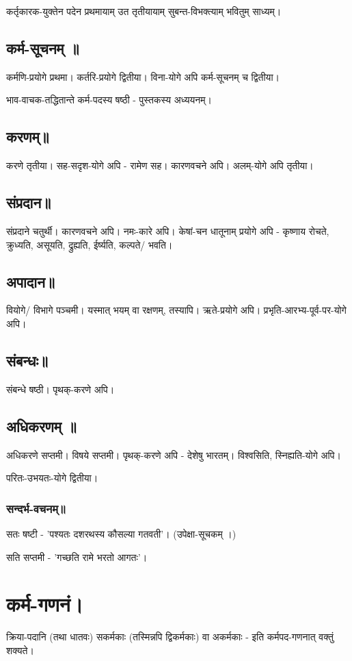 \documentclass[oneside, article]{memoir}
\begin{document}
कर्तृकारक-युक्तेन पदेन प्रथमायाम् उत तृतीयायाम् सुबन्त-विभक्त्याम् भवितुम् साध्यम्।

\subsection{कर्म-सूचनम् ॥}
कर्मणि-प्रयोगे प्रथमा। कर्तरि-प्रयोगे द्वितीया। विना-योगे अपि कर्म-सूचनम् च द्वितीया।

भाव-वाचक-तद्धितान्ते कर्म-पदस्य षष्ठी - पुस्तकस्य अध्ययनम्।

\subsection{करणम्॥}
करणे तृतीया। सह-सदृश-योगे अपि - रामेण सह। कारणवचने अपि। अलम्-योगे अपि तृतीया।

\subsection{संप्रदान॥}
संप्रदाने चतुर्थी। कारणवचने अपि। नमः-कारे अपि। केषां-चन धातूनाम् प्रयोगे अपि - कृष्णाय रोचते, क्रुध्यति, असूयति, द्रुह्यति, ईर्ष्यति, कल्पते/ भवति।

\subsection{अपादान॥}
वियोगे/ विभागे पञ्चमी। यस्मात् भयम् वा रक्षणम्, तस्यापि। ऋते-प्रयोगे अपि। प्रभृति-आरभ्य-पूर्व-पर-योगे अपि।

\subsection{संबन्धः॥}
संबन्धे षष्ठी। पृथक्-करणे अपि।

\subsection{अधिकरणम् ॥}
अधिकरणे सप्तमी। विषये सप्तमी। पृथक्-करणे अपि - देशेषु भारतम्। विश्वसिति, स्निह्यति-योगे अपि।

परितः-उभयतः-योगे द्वितीया।

\subsubsection{सन्दर्भ-वचनम्॥}
सतः षष्टी - 'पश्यतः दशरथस्य कौसल्या गतवती'। (उपेक्षा-सूचकम् ।)

सति सप्तमी - 'गच्छति रामे भरतो आगतः'।


\section{कर्म-गणनं।}
क्रिया-पदानि (तथा धातवः) सकर्मकाः (तस्मिन्नपि द्विकर्मकाः) वा अकर्मकाः - इति कर्मपद-गणनात् वक्तुं शक्यते।
\end{document}
